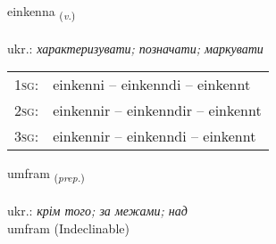 \documentclass[frontgrid, backgrid]{flacards}\usepackage[]{graphicx}\usepackage[]{xcolor}
\begin{document}
\renewcommand{\flhead}{\vskip5pt \fboxsep=0pt {\small\bfseries\footnotesize Sagnorð | дієслово}}
\renewcommand{\fcfoot}{\vskip5pt \fboxsep=0pt \hspace{2pt}{\small\bfseries\footnotesize 2K}}

\renewcommand{\blhead}{\vskip5pt {\small\bfseries\footnotesize Sagnorð | дієслово }}
\renewcommand{\bcfoot}{\vskip5pt \hspace{2pt}{\small\bfseries\footnotesize 2K}}


{einkenna \small{\textsubscript{(\textit{v.})}} \\[1ex] %
\textphonetic{[eiɲcʰɛna]} \\
ukr.: \emph{характеризувати; позначати; маркувати} \\  [2ex]
\renewcommand*{\arraystretch}{0.8}
\begin{tabular}{p{1cm}l}
\textsc{1sg}: & einkenni -- einkenndi -- einkennt \\ 
\textsc{2sg}: & einkennir -- einkenndir -- einkennt \\ 
\textsc{3sg}: & einkennir -- einkenndi -- einkennt \\ 
\end{tabular}
}


\renewcommand{\flhead}{\vskip5pt \fboxsep=0pt {\small\bfseries\footnotesize Forsetning | прийменник}}
\renewcommand{\fcfoot}{\vskip5pt \fboxsep=0pt \hspace{2pt}{\small\bfseries\footnotesize 2K}}

\renewcommand{\blhead}{\vskip5pt {\small\bfseries\footnotesize Forsetning | прийменник }}
\renewcommand{\bcfoot}{\vskip5pt \hspace{2pt}{\small\bfseries\footnotesize 2K}}


{umfram \small{\textsubscript{(\textit{prep.})}} \\[1ex]
\textphonetic{[ʏmfram]} \\
ukr.: \emph{крім того; за межами; над} \\  [2ex]
umfram (Indeclinable)}
\end{document}
